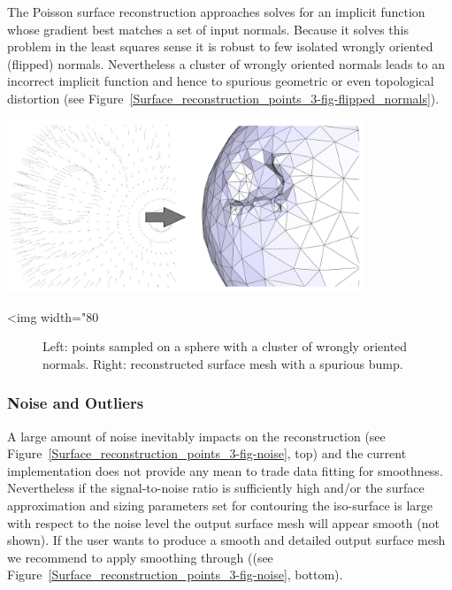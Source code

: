 The Poisson surface reconstruction approaches solves for an implicit function whose gradient best matches a set of input normals. Because it solves this problem in the least squares sense it is robust to few isolated wrongly oriented (flipped) normals. Nevertheless a cluster of wrongly oriented normals leads to an incorrect implicit function and hence to spurious geometric or even topological distortion (see Figure~\ref{Surface_reconstruction_points_3-fig-flipped_normals}).

\begin{center}
    \label{Surface_reconstruction_points_3-fig-flipped_normals}
    \begin{ccTexOnly}
\includegraphics[width=0.8\textwidth]{Surface_reconstruction_points_3/flipped_normals}
    \end{ccTexOnly}
    \begin{ccHtmlOnly}
        <img width="80%
    \end{ccHtmlOnly}
    \begin{figure}[h]
        \caption{Left: points sampled on a sphere with a cluster
                 of wrongly oriented normals.
                 Right: reconstructed surface mesh with a spurious bump.}
    \end{figure}
\end{center}


\subsubsection{Noise and Outliers}

A large amount of noise inevitably impacts on the reconstruction (see Figure~\ref{Surface_reconstruction_points_3-fig-noise}, top) and the current implementation does not provide any mean to trade data fitting for smoothness. Nevertheless if the signal-to-noise ratio is sufficiently high and/or the
surface approximation and sizing parameters set for contouring the iso-surface is large with respect to the noise level the output surface mesh will appear smooth (not shown). If the user wants to produce a smooth and detailed output surface mesh we recommend to apply smoothing through  ((see Figure~\ref{Surface_reconstruction_points_3-fig-noise}, bottom).

